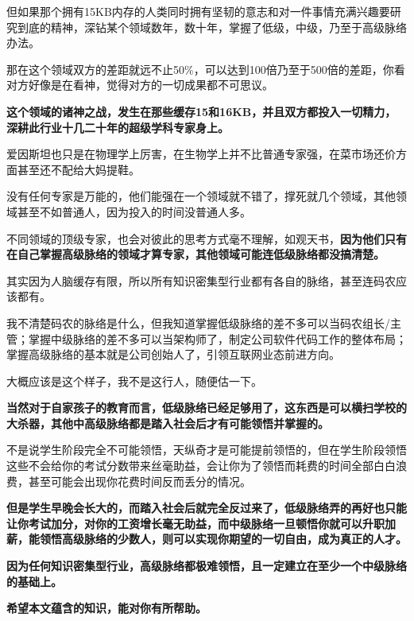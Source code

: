\documentclass[UTF8, 11pt, oneside]{ctexart}
\newcommand{\zd}[1]{\textbf{\textcolor[RGB]{123,12,0}{#1}}} %
\begin{document}
但如果那个拥有15KB内存的人类同时拥有坚韧的意志和对一件事情充满兴趣要研究到底的精神，深钻某个领域数年，数十年，掌握了低级，中级，乃至于高级脉络办法。

那在这个领域双方的差距就远不止50\%，可以达到100倍乃至于500倍的差距，你看对方好像是在看神，觉得对方的一切成果都不可思议。

\zd{这个领域的诸神之战，发生在那些缓存15和16KB，并且双方都投入一切精力，深耕此行业十几二十年的超级学科专家身上。}

爱因斯坦也只是在物理学上厉害，在生物学上并不比普通专家强，在菜市场还价方面甚至还不配给大妈提鞋。

没有任何专家是万能的，他们能强在一个领域就不错了，撑死就几个领域，其他领域甚至不如普通人，因为投入的时间没普通人多。

不同领域的顶级专家，也会对彼此的思考方式毫不理解，如观天书，\zd{因为他们只有在自己掌握高级脉络的领域才算专家，其他领域可能连低级脉络都没搞清楚。}

其实因为人脑缓存有限，所以所有知识密集型行业都有各自的脉络，甚至连码农应该都有。

我不清楚码农的脉络是什么，但我知道掌握低级脉络的差不多可以当码农组长/主管；掌握中级脉络的差不多可以当架构师了，制定公司软件代码工作的整体布局；掌握高级脉络的基本就是公司创始人了，引领互联网业态前进方向。

大概应该是这个样子，我不是这行人，随便估一下。

\zd{当然对于自家孩子的教育而言，低级脉络已经足够用了，这东西是可以横扫学校的大杀器，其他中高级脉络都是踏入社会后才有可能领悟并掌握的。}

不是说学生阶段完全不可能领悟，天纵奇才是可能提前领悟的，但在学生阶段领悟这些不会给你的考试分数带来丝毫助益，会让你为了领悟而耗费的时间全部白白浪费，甚至可能会出现你花费时间反而丢分的情况。

\zd{但是学生早晚会长大的，而踏入社会后就完全反过来了，低级脉络弄的再好也只能让你考试加分，对你的工资增长毫无助益，而中级脉络一旦顿悟你就可以升职加薪，能领悟高级脉络的少数人，则可以实现你期望的一切自由，成为真正的人才。}

\zd{因为任何知识密集型行业，高级脉络都极难领悟，且一定建立在至少一个中级脉络的基础上。}

\zd{希望本文蕴含的知识，能对你有所帮助。}
\end{document}
